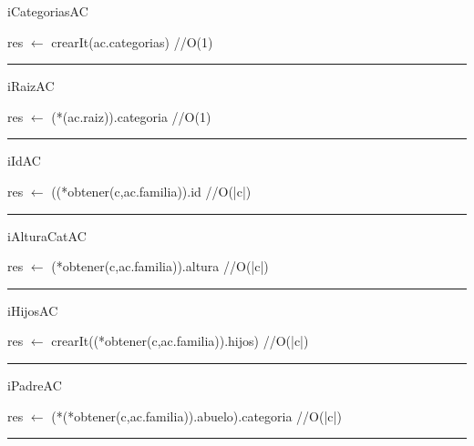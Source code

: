 \begin{algorithm}[H]
\caption{iCategoriasAC}
\begin{algorithmic}[1]
\state res $\gets$ crearIt(ac.categorias) \hfill //O(1)
\EndFunction 
\end{algorithmic}
\hrule
{}
\end{algorithm}

\begin{algorithm}[H]
\caption{iRaizAC}
\begin{algorithmic}[1]
\state res $\gets$ (*(ac.raiz)).categoria \hfill //O(1)
\EndFunction 
\end{algorithmic}
\hrule
{}
\end{algorithm}

\begin{algorithm}[H]
\caption{iIdAC}
\begin{algorithmic}[1]
\state res $\gets$ ((*obtener(c,ac.familia)).id \hfill //O(|c|)
\EndFunction 
\end{algorithmic}
\hrule
{}
\end{algorithm}

\begin{algorithm}[H]
\caption{iAlturaCatAC}
\begin{algorithmic}[1]
\state res $\gets$ (*obtener(c,ac.familia)).altura \hfill //O(|c|)
\EndFunction 
\end{algorithmic}
\hrule
{}
\end{algorithm}

\begin{algorithm}[H]
\caption{iHijosAC}
\begin{algorithmic}[1]
\state res $\gets$ crearIt((*obtener(c,ac.familia)).hijos) \hfill //O(|c|)
\EndFunction 
\end{algorithmic}
\hrule
{}
\end{algorithm}

\begin{algorithm}[H]
\caption{iPadreAC}
\begin{algorithmic}[1]
\state res $\gets$ (*(*obtener(c,ac.familia)).abuelo).categoria \hfill //O(|c|)
\EndFunction 
\end{algorithmic}
\hrule
{}
\end{algorithm}

